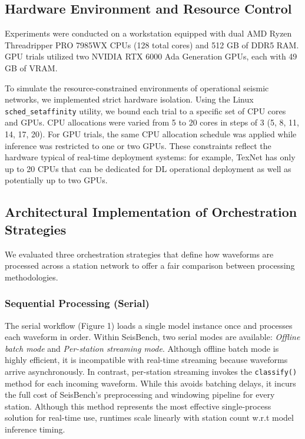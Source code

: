 \subsection{Hardware Environment and Resource Control}

Experiments were conducted on a workstation equipped with dual AMD Ryzen Threadripper PRO 7985WX CPUs (128 total cores) and 512 GB of DDR5 RAM. GPU trials utilized two NVIDIA RTX 6000 Ada Generation GPUs, each with 49 GB of VRAM.

To simulate the resource-constrained environments of operational seismic networks, we implemented strict hardware isolation. Using the Linux \texttt{sched\_setaffinity} utility, we bound each trial to a specific set of CPU cores and GPUs. CPU allocations were varied from 5 to 20 cores in steps of 3 (5, 8, 11, 14, 17, 20). For GPU trials, the same CPU allocation schedule was applied while inference was restricted to one or two GPUs. These constraints reflect the hardware typical of real-time deployment systems: for example, TexNet has only up to 20 CPUs that can be dedicated for DL operational deployment as well as potentially up to two GPUs.

\subsection{Architectural Implementation of Orchestration Strategies}

We evaluated three orchestration strategies that define how waveforms are processed across a station network to offer a fair comparison between processing methodologies.

\subsubsection{Sequential Processing (Serial)}

The serial workflow (Figure 1) loads a single model instance once and processes each waveform in order. Within SeisBench, two serial modes are available: \emph{Offline batch mode} and \emph{Per-station streaming mode}. Although offline batch mode is highly efficient, it is incompatible with real-time streaming because waveforms arrive asynchronously. In contrast, per-station streaming invokes the \texttt{classify()} method for each incoming waveform. While this avoids batching delays, it incurs the full cost of SeisBench’s preprocessing and windowing pipeline for every station. Although this method represents the most effective single-process solution for real-time use, runtimes scale linearly with station count w.r.t model inference timing.

